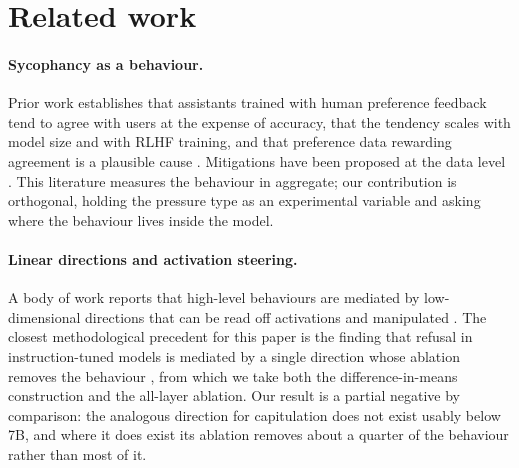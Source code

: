 \section{Related work}

\paragraph{Sycophancy as a behaviour.}
Prior work establishes that assistants trained with human preference feedback tend to agree
with users at the expense of accuracy, that the tendency scales with model size and with RLHF
training, and that preference data rewarding agreement is a plausible cause
\citep{sharma2023sycophancy, perez2022discovering}. Mitigations have been proposed at the data level
\citep{wei2023simple}. This literature measures the behaviour in aggregate; our contribution is
orthogonal, holding the pressure type as an experimental variable and asking where the
behaviour lives inside the model.

\paragraph{Linear directions and activation steering.}
A body of work reports that high-level behaviours are mediated by low-dimensional directions
that can be read off activations and manipulated \citep{zou2023repe, turner2023actadd, li2023iti}. The
closest methodological precedent for this paper is the finding that refusal in
instruction-tuned models is mediated by a single direction whose ablation removes the
behaviour \citep{arditi2024refusal}, from which we take both the difference-in-means construction
and the all-layer ablation. Our result is a partial negative by comparison: the analogous
direction for capitulation does not exist usably below 7B, and where it does exist its
ablation removes about a quarter of the behaviour rather than most of it.

